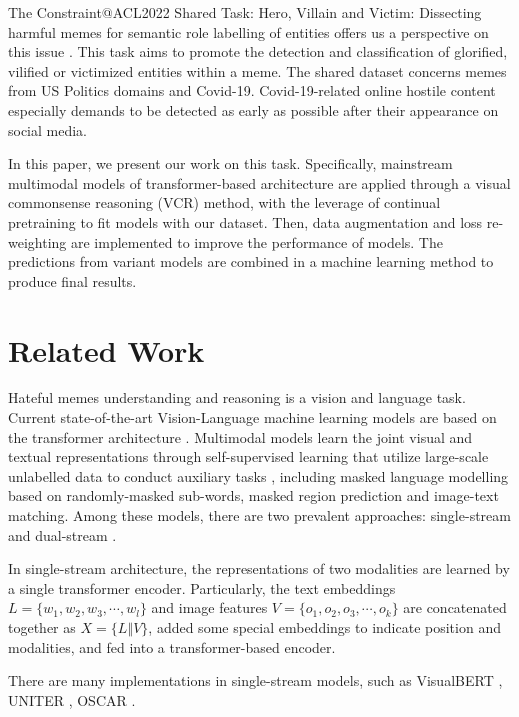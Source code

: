 \documentclass[11pt]{article}
\begin{document}
The Constraint@ACL2022 Shared Task: Hero, Villain and Victim: Dissecting harmful memes for semantic role labelling of entities offers us a perspective on this issue \citep{sharma2022report}. This task aims to promote the detection and classification of glorified, vilified or victimized entities within a meme. The shared dataset concerns memes from US Politics domains and Covid-19. Covid-19-related online hostile content especially demands to be detected as early as possible after their appearance on social media. 

In this paper, we present our work on this task. Specifically, mainstream multimodal models of transformer-based architecture are applied through a visual commonsense reasoning (VCR) method, with the leverage of continual pretraining to fit models with our dataset. Then, data augmentation and loss re-weighting are implemented to improve the performance of models. The predictions from variant models are combined in a machine learning method to produce final results. 



\section{Related Work}

Hateful memes understanding and reasoning is a vision and language task. Current state-of-the-art Vision-Language machine learning models are based on the transformer architecture \citep{vaswani2017attention}. Multimodal models learn the joint visual and textual representations through self-supervised learning that utilize large-scale unlabelled data to conduct auxiliary tasks \citep{chen2022vlp}, including masked language modelling based on randomly-masked sub-words, masked region prediction and image-text matching. Among these models, there are two prevalent approaches: single-stream and dual-stream \citep{du2022survey}. 

In single-stream architecture, the representations of two modalities are learned by a single transformer encoder. Particularly, the text embeddings $ L  = \{w_1, w_2, w_3, \cdots, w_l\} $ and image features $V = \{o_1, o_2,o_3, \cdots , o_k\}$ are concatenated together as $X = \{ L \mathbin\Vert  V \} $, added some special embeddings to indicate position and modalities, and fed into a transformer-based encoder.

There are many implementations in single-stream models, such as VisualBERT \citep{li2019visualbert}, UNITER \citep{chen2020uniter}, OSCAR 
\citep{li2020oscar}.
\end{document}

